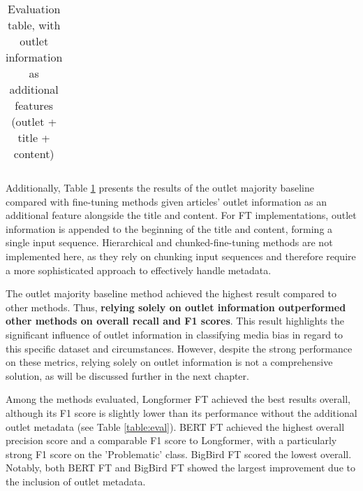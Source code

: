 \begin{table}[htbp]
\begin{tabular}{| c | c | c | c | c |}
    \end{tabular}
    \caption{Evaluation table, with outlet information as additional features (outlet + title + content)}
    \label{table:eval-outlet}
\end{table}

Additionally, Table \ref{table:eval-outlet} presents the results of the outlet majority baseline compared with fine-tuning methods given articles' outlet information as an additional feature alongside the title and content. For FT implementations, outlet information is appended to the beginning of the title and content, forming a single input sequence. Hierarchical and chunked-fine-tuning methods are not implemented here, as they rely on chunking input sequences and therefore require a more sophisticated approach to effectively handle metadata.

The outlet majority baseline method achieved the highest result compared to other methods. Thus, \textbf{relying solely on outlet information outperformed other methods on overall recall and F1 scores}. This result highlights the significant influence of outlet information in classifying media bias in regard to this specific dataset and circumstances. However, despite the strong performance on these metrics, relying solely on outlet information is not a comprehensive solution, as will be discussed further in the next chapter.

Among the methods evaluated, Longformer FT achieved the best results overall, although its F1 score is slightly lower than its performance without the additional outlet metadata (see Table \ref{table:eval}). BERT FT achieved the highest overall precision score and a comparable F1 score to Longformer, with a particularly strong F1 score on the 'Problematic' class. BigBird FT scored the lowest overall. Notably, both BERT FT and BigBird FT showed the largest improvement due to the inclusion of outlet metadata.


